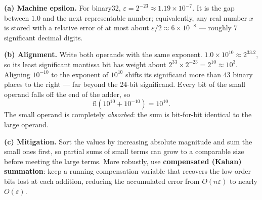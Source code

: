 \documentclass[11pt]{article}
\begin{document}
\begin{corrige}
\textbf{(a) Machine epsilon.} For binary32, $\varepsilon = 2^{-23} \approx 1.19\times 10^{-7}$. It is the gap between $1.0$ and the next representable number; equivalently, any real number $x$ is stored with a relative error of at most about $\varepsilon/2 \approx 6\times 10^{-8}$ — roughly 7 significant decimal digits.

\textbf{(b) Alignment.} Write both operands with the same exponent. $1.0\times 10^{10} \approx 2^{33.2}$, so its least significant mantissa bit has weight about $2^{33}\times 2^{-23} = 2^{10} \approx 10^{3}$. Aligning $10^{-10}$ to the exponent of $10^{10}$ shifts its significand more than 43 binary places to the right — far beyond the 24-bit significand. Every bit of the small operand falls off the end of the adder, so
\[ \mathrm{fl}\left(10^{10} + 10^{-10}\right) = 10^{10}. \]
The small operand is completely \emph{absorbed}: the sum is bit-for-bit identical to the large operand.

\textbf{(c) Mitigation.} Sort the values by increasing absolute magnitude and sum the small ones first, so partial sums of small terms can grow to a comparable size before meeting the large terms. More robustly, use \textbf{compensated (Kahan) summation}: keep a running compensation variable that recovers the low-order bits lost at each addition, reducing the accumulated error from $O(n\varepsilon)$ to nearly $O(\varepsilon)$.
\end{corrige}
\end{document}
